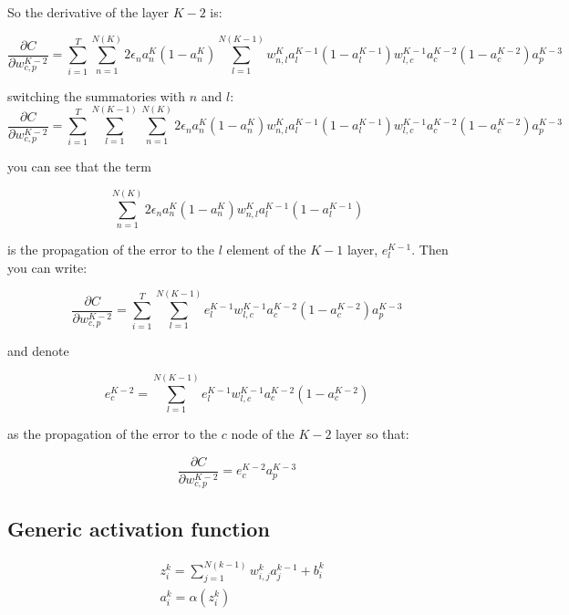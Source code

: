 \documentclass[11pt]{article}
\begin{document}
So the derivative of the layer \(K-2\) is:

\begin{equation}
\frac{\partial C}{\partial w_{c,p}^{K-2}} = \sum_{i=1}^{T}\sum_{n=1}^{N(K)} 2\epsilon_{n}a_{n}^{K}(1-a_{n}^{K})\sum_{l=1}^{N(K-1)} w_{n, l}^{K}a_{l}^{K-1}(1-a_{l}^{K-1})w_{l,c}^{K-1}a_{c}^{K-2}(1-a_{c}^{K-2})a_{p}^{K-3}
\end{equation}

switching the summatories with \(n\) and \(l\):
\begin{equation}
\frac{\partial C}{\partial w_{c,p}^{K-2}} = \sum_{i=1}^{T}\sum_{l=1}^{N(K-1)}\sum_{n=1}^{N(K)} 2\epsilon_{n}a_{n}^{K}(1-a_{n}^{K})w_{n, l}^{K}a_{l}^{K-1}(1-a_{l}^{K-1})w_{l,c}^{K-1}a_{c}^{K-2}(1-a_{c}^{K-2})a_{p}^{K-3}
\end{equation}

you can see that the term

\begin{equation}
\sum_{n=1}^{N(K)} 2\epsilon_{n}a_{n}^{K}(1-a_{n}^{K})w_{n, l}^{K}a_{l}^{K-1}(1-a_{l}^{K-1})
\end{equation}

is the propagation of the error to the \(l\) element of the \(K-1\) layer, \(e_{l}^{K-1}\). Then you can write:

\begin{equation}
\frac{\partial C}{\partial w_{c,p}^{K-2}} = \sum_{i=1}^{T}\sum_{l=1}^{N(K-1)}e_{l}^{K-1}w_{l,c}^{K-1}a_{c}^{K-2}(1-a_{c}^{K-2})a_{p}^{K-3}
\end{equation}

and denote

\begin{equation}
e_{c}^{K-2} = \sum_{l=1}^{N(K-1)}e_{l}^{K-1}w_{l,c}^{K-1}a_{c}^{K-2}(1-a_{c}^{K-2})
\end{equation}

as the propagation of the error to the \(c\) node of the \(K-2\) layer so that:

\begin{equation}
\frac{\partial C}{\partial w_{c,p}^{K-2}} = e_{c}^{K-2}a_{p}^{K-3}
\end{equation}
\subsection{Generic activation function}
\label{sec:orgd0c2550}

\begin{align}
&z_{i}^{k} = \sum_{j=1}^{N(k-1)} w_{i,j}^{k}a_{j}^{k-1} + b_{i}^{k}
\\
&a_{i}^{k} = \alpha(z_{i}^{k})
\end{align}
\end{document}

